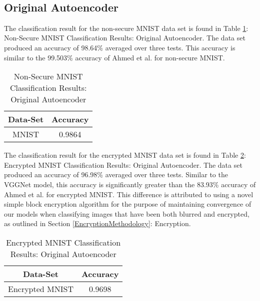 \documentclass[12pt, titlepage]{article}
\begin{document}
~\newpage
\subsection{Original Autoencoder}\label{EvalOrigAE} 

The classification result for the non-secure MNIST data set is found in Table \ref{table:basicAE_MNIST}: Non-Secure MNIST Classification Results: Original Autoencoder. The data set produced an accuracy of 98.64\% averaged over three tests. This accuracy is similar to the 99.503\% accuracy of Ahmed et al. for non-secure MNIST.\\ 

\begin{table}[!h]
	\begin{center}
		\begin{tabular}{| c | c |}
			\hline
			\textbf{Data-Set} & \textbf{Accuracy}\\
			\hline
			MNIST & 0.9864\\
			\hline
		\end{tabular}
		\caption{Non-Secure MNIST Classification Results: Original Autoencoder}
		\label{table:basicAE_MNIST}
	\end{center}
\end{table}

\noindent The classification result for the encrypted MNIST data set is found in Table \ref{table:basicAE_Encryption}: Encrypted MNIST Classification Results: Original Autoencoder. The data set produced an accuracy of 96.98\% averaged over three tests. Similar to the VGGNet model, this accuracy is significantly greater than the 83.93\% accuracy of Ahmed et al. for encrypted MNIST. This difference is attributed to using a novel simple block encryption algorithm for the purpose of maintaining convergence of our models when classifying images that have been both blurred and encrypted, as outlined in Section \ref{EncryptionMethodology}: Encryption.\\

\begin{table}[!h]
	\begin{center}
		\begin{tabular}{| c | c |}
			\hline
			\textbf{Data-Set} & \textbf{Accuracy}\\
			\hline
			Encrypted MNIST & 0.9698\\
			\hline
		\end{tabular}
		\caption{Encrypted MNIST Classification Results: Original Autoencoder}
		\label{table:basicAE_Encryption}
	\end{center}
\end{table}
\end{document}
